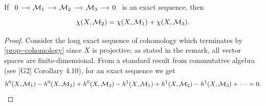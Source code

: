 \documentclass[a4paper,11pt]{article}
\begin{document}
			\begin{prop}
				If $\begin{tikzcd}[column sep=small]
					0\ar[r] & \M_1\ar[r] & \M_2\ar[r] & \M_3\ar[r] & 0
				\end{tikzcd}$ is an exact sequence, then
				\begin{equation*}
					\chi(X,\mathcal{M}_2)=\chi(X,\mathcal{M}_1)+\chi(X,\mathcal{M}_3).
				\end{equation*}
			\end{prop}
			\begin{proof}
				Consider the long exact sequence of cohomology which terminates by \autoref{prop--cohomology} since $X$ is projective; as stated in the remark, all vector spaces are finite-dimensional. From a standard result from commutative algebra (see [G2] Corollary 4.10), for an exact sequence we get
				\begin{equation*}
					h^0(X,\mathcal{M}_1)-h^0(X,\mathcal{M}_2)+h^0(X,\mathcal{M}_3)-h^1(X,\mathcal{M}_1)+h^1(X,\mathcal{M}_2)-h^1(X,\mathcal{M}_3)+\dots=0.
				\end{equation*}
			\end{proof}
\end{document}
